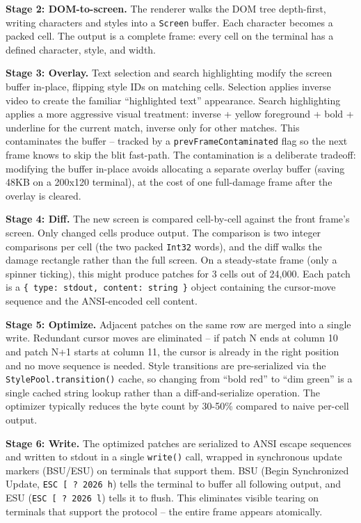 \documentclass[
  english,
  11pt,
  letterpaper,
]{book}
\begin{document}
\textbf{Stage 2: DOM-to-screen.} The renderer walks the DOM tree
depth-first, writing characters and styles into a \texttt{Screen}
buffer. Each character becomes a packed cell. The output is a complete
frame: every cell on the terminal has a defined character, style, and
width.

\textbf{Stage 3: Overlay.} Text selection and search highlighting modify
the screen buffer in-place, flipping style IDs on matching cells.
Selection applies inverse video to create the familiar ``highlighted
text'' appearance. Search highlighting applies a more aggressive visual
treatment: inverse + yellow foreground + bold + underline for the
current match, inverse only for other matches. This contaminates the
buffer -- tracked by a \texttt{prevFrameContaminated} flag so the next
frame knows to skip the blit fast-path. The contamination is a
deliberate tradeoff: modifying the buffer in-place avoids allocating a
separate overlay buffer (saving 48KB on a 200x120 terminal), at the cost
of one full-damage frame after the overlay is cleared.

\textbf{Stage 4: Diff.} The new screen is compared cell-by-cell against
the front frame's screen. Only changed cells produce output. The
comparison is two integer comparisons per cell (the two packed
\texttt{Int32} words), and the diff walks the damage rectangle rather
than the full screen. On a steady-state frame (only a spinner ticking),
this might produce patches for 3 cells out of 24,000. Each patch is a
\texttt{\{\ type:\ \textquotesingle{}stdout\textquotesingle{},\ content:\ string\ \}}
object containing the cursor-move sequence and the ANSI-encoded cell
content.

\textbf{Stage 5: Optimize.} Adjacent patches on the same row are merged
into a single write. Redundant cursor moves are eliminated -- if patch N
ends at column 10 and patch N+1 starts at column 11, the cursor is
already in the right position and no move sequence is needed. Style
transitions are pre-serialized via the \texttt{StylePool.transition()}
cache, so changing from ``bold red'' to ``dim green'' is a single cached
string lookup rather than a diff-and-serialize operation. The optimizer
typically reduces the byte count by 30-50\% compared to naive per-cell
output.

\textbf{Stage 6: Write.} The optimized patches are serialized to ANSI
escape sequences and written to stdout in a single \texttt{write()}
call, wrapped in synchronous update markers (BSU/ESU) on terminals that
support them. BSU (Begin Synchronized Update,
\texttt{ESC\ {[}\ ?\ 2026\ h}) tells the terminal to buffer all
following output, and ESU (\texttt{ESC\ {[}\ ?\ 2026\ l}) tells it to
flush. This eliminates visible tearing on terminals that support the
protocol -- the entire frame appears atomically.
\end{document}
